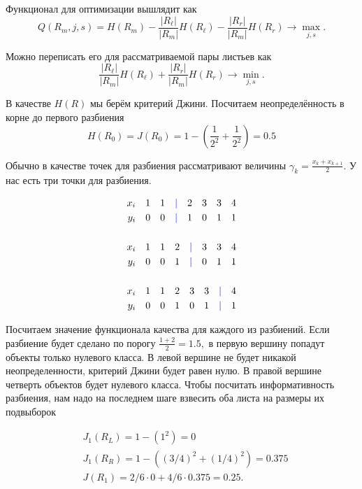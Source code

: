 \documentclass[12pt,a4paper]{article}
\begin{document}
\begin{esSolution}
    Функционал для оптимизации вышлядит как 
    \[
    Q(R_m, j, s)
    =
    H(R_m)
    -
    \frac{|R_\ell|}{|R_m|}
    H(R_\ell)
    -
    \frac{|R_r|}{|R_m|}
    H(R_r) \to \max_{j,s}.
    \]

    Можно переписать его для рассматриваемой пары листьев как 
    \[
    \frac{|R_\ell|}{|R_m|}
    H(R_\ell)
    +
    \frac{|R_r|}{|R_m|}
    H(R_r) \to \min_{j,s}.
    \]

    В качестве $H(R)$ мы берём критерий Джини. Посчитаем неопределённость в корне до первого разбиения
    \[
    H(R_0) = J(R_0) = 1 - \left( \frac{1}{2^2} + \frac{1}{2^2} \right) = 0.5
    \]
    
    Обычно в качестве точек для разбиения рассматривают величины $\gamma_k = \frac{x_k + x_{k + 1}}{2}.$ У нас есть три точки для разбиения.

    \[ 
    \begin{aligned}
    x_i \quad 1 \quad 1 \quad {\color{blue}|} \quad 2 \quad 3 \quad 3 \quad 4 \\ 
    y_i \quad 0 \quad 0 \quad {\color{blue}|} \quad 1 \quad 0 \quad 1 \quad 1 \\ \mbox{ } \\ 
    x_i \quad 1 \quad 1 \quad 2 \quad  {\color{blue}|} \quad 3 \quad 3 \quad 4 \\ 
    y_i \quad 0 \quad 0 \quad  1 \quad {\color{blue}|} \quad 0 \quad 1 \quad 1 \\ \mbox{ } \\ 
    x_i \quad 1 \quad 1 \quad 2 \quad 3 \quad 3 \quad  {\color{blue}|} \quad 4 \\
    y_i \quad 0 \quad 0 \quad  1 \quad  0 \quad 1  \quad {\color{blue}|} \quad 1 \\
    \end{aligned}
    \]

    Посчитаем значение функционала качества для каждого из разбиений. Если разбиение будет сделано по порогу $\frac{1 + 2}{2} = 1.5,$ в первую вершину попадут объекты только нулевого класса. В левой вершине не будет никакой неопределенности, критерий Джини будет равен нулю. В правой вершине четверть объектов будет нулевого класса. Чтобы посчитать информативность разбиения, нам надо на последнем шаге взвесить оба листа на размеры их подвыборок
    
    \[ \begin{aligned}
    & J_1(R_L) = 1 - (1^2) = 0 \\
    & J_1(R_R) = 1 - ((3/4)^2 + (1/4)^2) = 0.375 \\
    & J(R_1) = 2/6 \cdot 0 + 4/6 \cdot 0.375 = 0.25.
    \end{aligned} \]


\end{esSolution}
\end{document}
